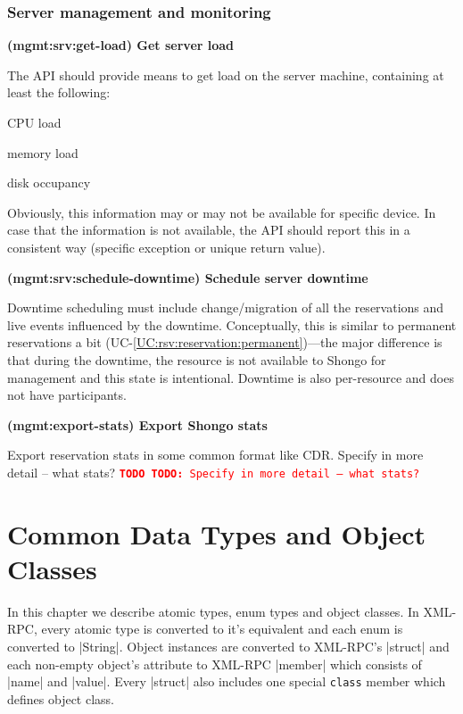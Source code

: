 \documentclass[a4paper]{report}
\makeatletter
\newcommand{\ApiValue}[1]{\verb|#1|}
\newcounter{UCcounter}
\newenvironment{UseCases}%
	{\begin{list}{\textbf{UC-\arabic{UCcounter}}}{\@nmbrlisttrue\def\@listctr{UCcounter}}}%
	{\end{list}}
\newcommand{\UClabel}[1]{\label{UC:#1}}
\newcommand{\UCref}[1]{UC-\ref{UC:#1}}
\newcommand{\UseCase}[2]{\item\UClabel{#2} \textbf{(#2) #1}\\ \nopagebreak}
\newcommand{\TODO}[1]{%
\def\empty{}%
\def\prvniparametr{#1}%
\ifx\prvniparametr\empty%
\begingroup\tt\textcolor{red}{\noindent\textbf{TODO}}\endgroup
\else%
\begingroup\tt\textcolor{red}{\noindent\textbf{TODO:}\ #1}\endgroup
\fi%
}
\makeatother
\begin{document}
\subsection{Server management and monitoring}

\begin{UseCases}

\UseCase{Get server load}{mgmt:srv:get-load}

The API should provide means to get load on the server machine, containing at
least the following:

\begin{compactitem}

\item CPU load

\item memory load

\item disk occupancy

\end{compactitem}

Obviously, this information may or may not be available for specific device.
In case that the information is not available, the API should report this in a
consistent way (specific exception or unique return value).


\UseCase{Schedule server downtime}{mgmt:srv:schedule-downtime}

Downtime scheduling must include change/migration of all the reservations and
live events influenced by the downtime. Conceptually, this is similar to
permanent reservations a bit (\UCref{rsv:reservation:permanent})---the major
difference is that during the downtime, the resource is not available to Shongo
for management and this state is intentional. Downtime is also per-resource and
does not have participants.

\UseCase{Export Shongo stats}{mgmt:export-stats}

Export reservation stats in some common format like CDR.
\TODO{Specify in more detail -- what stats?}

\end{UseCases}




\chapter{Common Data Types and Object Classes}

In this chapter we describe atomic types, enum types and object classes. In XML-RPC, every atomic type is converted to it's equivalent and each enum is converted to |String|. Object instances are converted to XML-RPC's |struct| and each non-empty object's attribute to XML-RPC |member| which consists of |name| and |value|. Every |struct| also includes one special \ApiValue{class} member which defines object class.
\end{document}
